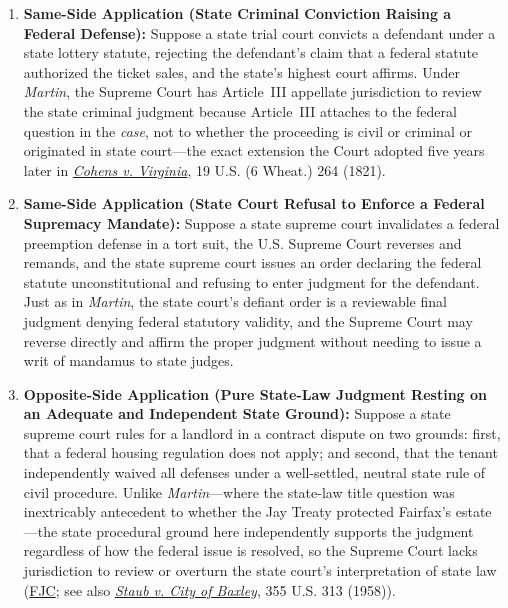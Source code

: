 \documentclass[12pt]{article}
\begin{document}
\begin{enumerate}
    \item \textbf{Same-Side Application (State Criminal Conviction Raising a Federal Defense):} Suppose a state trial court convicts a defendant under a state lottery statute, rejecting the defendant's claim that a federal statute authorized the ticket sales, and the state's highest court affirms. Under \textit{Martin}, the Supreme Court has Article~III appellate jurisdiction to review the state criminal judgment because Article~III attaches to the federal question in the \textit{case}, not to whether the proceeding is civil or criminal or originated in state court---the exact extension the Court adopted five years later in \textit{\href{https://supreme.justia.com/cases/federal/us/19/264/}{Cohens v. Virginia}}, 19 U.S. (6 Wheat.) 264 (1821).

    \item \textbf{Same-Side Application (State Court Refusal to Enforce a Federal Supremacy Mandate):} Suppose a state supreme court invalidates a federal preemption defense in a tort suit, the U.S. Supreme Court reverses and remands, and the state supreme court issues an order declaring the federal statute unconstitutional and refusing to enter judgment for the defendant. Just as in \textit{Martin}, the state court's defiant order is a reviewable final judgment denying federal statutory validity, and the Supreme Court may reverse directly and affirm the proper judgment without needing to issue a writ of mandamus to state judges.

    \item \textbf{Opposite-Side Application (Pure State-Law Judgment Resting on an Adequate and Independent State Ground):} Suppose a state supreme court rules for a landlord in a contract dispute on two grounds: first, that a federal housing regulation does not apply; and second, that the tenant independently waived all defenses under a well-settled, neutral state rule of civil procedure. Unlike \textit{Martin}---where the state-law title question was inextricably antecedent to whether the Jay Treaty protected Fairfax's estate---the state procedural ground here independently supports the judgment regardless of how the federal issue is resolved, so the Supreme Court lacks jurisdiction to review or overturn the state court's interpretation of state law (\href{https://www.fjc.gov/history/cases/cases-that-shaped-the-federal-courts/martin-v-hunter-s-lessee}{FJC}; see also \textit{\href{https://supreme.justia.com/cases/federal/us/355/313/}{Staub v. City of Baxley}}, 355 U.S. 313 (1958)).


\end{enumerate}
\end{document}

